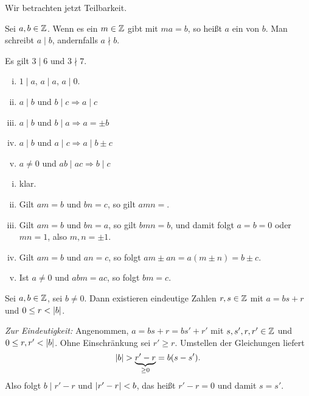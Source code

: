 	Wir betrachten jetzt Teilbarkeit.
	
	\begin{definition}[Teiler]
		\label{def:teiler}
		Sei $a,b \in \mathbb{Z}$.
		Wenn es ein $m \in \mathbb{Z}$ gibt mit $ma = b$, so heißt $a$ ein  von $b$.
		Man schreibt $a \mid b$, andernfalls $a \nmid b$. 
	\end{definition}

	\begin{beispiel}
		Es gilt $3 \mid 6$ und $3 \nmid 7$.
	\end{beispiel}

	\begin{satz}
		\label{satz:rechenregeln}
		\begin{enumerate}[(i)]
			\item $1 \mid a$, $a \mid a$, $a \mid 0$.
			\item $a \mid b$ und $b \mid c \Rightarrow a \mid c$
			\item $a \mid b$ und $b \mid a \Rightarrow a = \pm b$
			\item $a \mid b$ und $a \mid c \Rightarrow a \mid b \pm c$
			\item $a \neq 0$ und $ab \mid ac \Rightarrow b \mid c$
		\end{enumerate}
	\end{satz}

	\begin{beweis}
		\begin{enumerate}[(i)]
			\item klar.
			\item Gilt $am = b$ und $bn = c$, so gilt $amn = $.
			\item Gilt $am = b$ und $bn = a$, so gilt $bmn = b$, und damit folgt $a = b = 0$ oder $mn = 1$, also $m,n = \pm 1$.
			\item Gilt $am = b$ und $an = c$, so folgt $am \pm an = a(m \pm n) = b \pm c$.
			\item Ist $a \neq 0$ und $abm = ac$, so folgt $bm = c$.
		\end{enumerate}
	\end{beweis}

	\begin{satz}
		\label{satz:teilen mit rest}
		Sei $a,b \in \mathbb{Z}$, sei $b \neq 0$. 
		Dann existieren eindeutige Zahlen $r,s \in \mathbb{Z}$ mit $a = bs + r$ und $0 \leq r < \left\lvert b\right\rvert$.
	\end{satz}

	\begin{beweis}
		\textit{Zur Eindeutigkeit:} Angenommen, $a = bs + r = bs' + r'$ mit $s,s',r,r' \in \mathbb{Z}$ und $0 \leq r,r' < \left\lvert b\right\rvert$.
		Ohne Einschränkung sei $r' \geq r$.
		Umstellen der Gleichungen liefert
		\[
			\left\lvert b\right\rvert > \underbrace{r' - r}_{\geq 0} = b(s - s').
		\]
		Also folgt $b \mid r'-r$ und $\left\lvert r' - r\right\rvert < b$, das heißt $r' - r = 0$ und damit $s = s'$.
	\end{beweis}
\cleardoubleoddemptypage